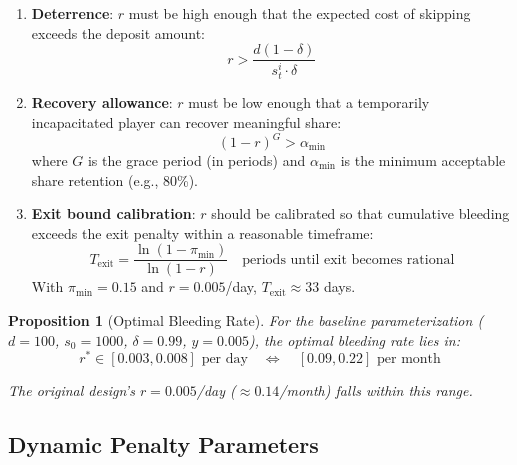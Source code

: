 \documentclass[12pt]{article}
\newtheorem{proposition}{Proposition}
\begin{document}
\begin{enumerate}
    \item \textbf{Deterrence}: $r$ must be high enough that the expected cost of skipping exceeds the deposit amount:
    \[
    r > \frac{d(1-\delta)}{s_t^i \cdot \delta}
    \]

    \item \textbf{Recovery allowance}: $r$ must be low enough that a temporarily incapacitated player can recover meaningful share:
    \[
    (1-r)^{G} > \alpha_{\min}
    \]
    where $G$ is the grace period (in periods) and $\alpha_{\min}$ is the minimum acceptable share retention (e.g., 80\%).

    \item \textbf{Exit bound calibration}: $r$ should be calibrated so that cumulative bleeding exceeds the exit penalty within a reasonable timeframe:
    \[
    T_{\text{exit}} = \frac{\ln(1 - \pi_{\min})}{\ln(1-r)} \quad \text{periods until exit becomes rational}
    \]
    With $\pi_{\min} = 0.15$ and $r = 0.005$/day, $T_{\text{exit}} \approx 33$ days.
\end{enumerate}

\begin{proposition}[Optimal Bleeding Rate]
For the baseline parameterization ($d = 100$, $s_0 = 1000$, $\delta = 0.99$, $y = 0.005$), the optimal bleeding rate lies in:
\[
r^* \in [0.003, 0.008] \text{ per day} \quad \Leftrightarrow \quad [0.09, 0.22] \text{ per month}
\]

The original design's $r = 0.005$/day ($\approx 0.14$/month) falls within this range.
\end{proposition}


\subsection{Dynamic Penalty Parameters}
\end{document}
